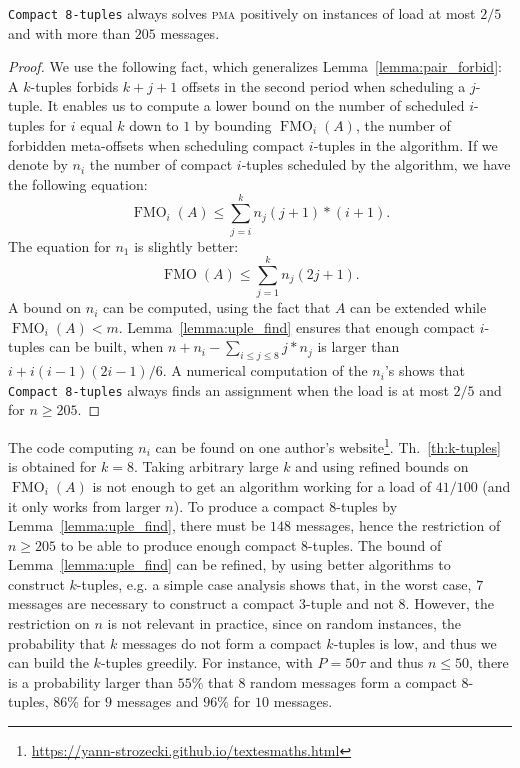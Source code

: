 \documentclass[a4paper,UKenglish,cleveref, autoref, thm-restate]{lipics-v2019}
\DeclareMathOperator{\Fmo}{FMO}
\newcommand\pma{\textsc{pma}\xspace}
\begin{document}
\begin{theorem}\label{th:k-tuples}
\texttt{Compact 8-tuples} always solves \pma positively on instances of load at most $2/5$and with more than $205$ messages.
\end{theorem}
\begin{proof}
We use the following fact, which generalizes Lemma~\ref{lemma:pair_forbid}: A $k$-tuples forbids $k+j+1$ offsets in the second period when scheduling a $j$-tuple. 
It enables us to compute a lower bound on the number of scheduled $i$-tuples for $i$ equal $k$ down to $1$ by bounding $\Fmo_i(A)$, the number of forbidden meta-offsets when scheduling compact $i$-tuples in the algorithm.
If we denote by $n_i$ the number of compact $i$-tuples scheduled by the algorithm,
we have the following equation:  $$ \Fmo_i(A) \leq \displaystyle{\sum_{j=i}^k n_j(j+1)*(i+1)}.$$
The equation for $n_1$ is slightly better: 
$$ \Fmo(A) \leq \displaystyle{\sum_{j=1}^k n_j(2j + 1)}.$$
A bound on $n_i$ can be computed, using the fact that $A$ can be extended while $\Fmo_i(A) < m$. 
Lemma~\ref{lemma:uple_find} ensures that enough compact $i$-tuples can be built, when $n + n_i - \sum_{i \leq j \leq 8} j*n_j$ is larger than $i + i(i-1)(2i-1)/6$. 
A numerical computation of the $n_i$'s shows that \texttt{Compact 8-tuples} always finds an assignment when the load is at most $2/5$ and for $n \geq 205$.
\end{proof}

The code computing $n_i$ can be found on one author's website\footnote{\url{https://yann-strozecki.github.io/textesmaths.html}}. Th.~\ref{th:k-tuples} is obtained for $k=8$. Taking arbitrary large $k$ and using refined bounds on $\Fmo_i(A)$ is not enough to get an algorithm working for a load of $41/100$ (and it only works from larger $n$). To produce a compact $8$-tuples by Lemma~\ref{lemma:uple_find}, there must be $148$ messages, hence the restriction of $n \geq 205$ to be able to produce enough compact $8$-tuples.
The bound of Lemma~\ref{lemma:uple_find} can be refined, by using better algorithms to construct $k$-tuples, e.g. a simple case analysis shows that, in the worst case, $7$ messages are necessary to construct a compact $3$-tuple and not $8$. However, the restriction on $n$ is not relevant in practice, since on random instances, the probability that $k$ messages do not form a compact $k$-tuples is low, and thus we can build the $k$-tuples greedily. For instance, with $P=50\tau$ and thus $n \leq 50$, there is a probability larger than $55\%$ that $8$ random messages form a compact $8$-tuples, $86\%$ for $9$ messages and $96\%$ for $10$ messages.
\end{document}
